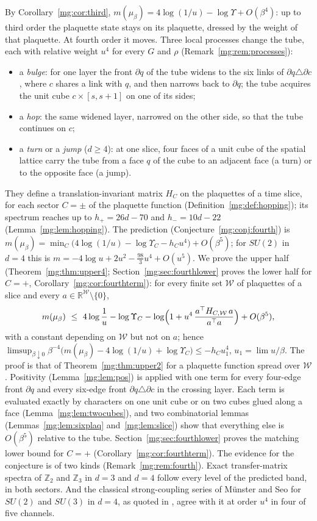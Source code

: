 \documentclass[11pt,a4paper]{article}
\theoremstyle{definition}
\theoremstyle{remark}
\newcommand{\R}{\mathbb{R}}
\begin{document}
By Corollary~\ref{mg:cor:third}, $m(\mu_\beta)=4\log(1/u)-\log\Upsilon+O(\beta^4)$: up to third order the plaquette state stays on its plaquette, dressed
by the weight of that plaquette. At fourth order it moves. Three local processes change the tube, each with relative weight $u^4$ for every $G$ and $\rho$
(Remark~\ref{mg:rem:processes}):
\begin{itemize}
\item a \emph{bulge}: for one layer the front $\partial q$ of the tube widens to the six links of $\partial q\triangle\partial c$, where $c$ shares a link with
$q$, and then narrows back to $\partial q$; the tube acquires the unit cube $c\times[s,s+1]$ on one of its sides;
\item a \emph{hop}: the same widened layer, narrowed on the other side, so that the tube continues on $c$;
\item a \emph{turn} or a \emph{jump} ($d\ge4$): at one slice, four faces of a unit cube of the spatial lattice carry the tube from a face $q$ of the cube to
an adjacent face (a turn) or to the opposite face (a jump).
\end{itemize}
They define a translation-invariant matrix $H_C$ on the plaquettes of a time slice, for each sector $C=\pm$ of the plaquette function
(Definition~\ref{mg:def:hopping}); its spectrum reaches up to $h_+=26d-70$ and $h_-=10d-22$ (Lemma~\ref{mg:lem:hopping}). The prediction
(Conjecture~\ref{mg:conj:fourth}) is $m(\mu_\beta)=\min_C\bigl(4\log(1/u)-\log\Upsilon_C-h_Cu^4\bigr)+O(\beta^5)$; for $SU(2)$ in $d=4$ this
is $m=-4\log u+2u^2-\frac{98}3u^4+O(u^5)$. We prove the upper half (Theorem~\ref{mg:thm:upper4}; Section~\ref{mg:sec:fourthlower} proves the lower half for $C=+$,
Corollary~\ref{mg:cor:fourthterm}): for every finite set $\mathcal W$ of plaquettes of a
slice and every $a\in\R^{\mathcal W}\setminus\{0\}$,
\[
m(\mu_\beta)\ \le\ 4\log\frac1u-\log\Upsilon_C-\log\Bigl(1+u^4\,\frac{a^\top H_{C,\mathcal W}\,a}{a^\top a}\Bigr)+O(\beta^5),
\]
with a constant depending on $\mathcal W$ but not on $a$; hence $\limsup_{\beta\downarrow0}\beta^{-4}\bigl(m(\mu_\beta)-4\log(1/u)+\log\Upsilon_C\bigr)\le-h_Cu_1^4$,
$u_1=\lim u/\beta$. The proof is that of Theorem~\ref{mg:thm:upper2} for a plaquette function spread over $\mathcal W$. Positivity
(Lemma~\ref{mg:lem:pos}) is applied with one term for every four-edge front $\partial q$ and every six-edge front $\partial q\triangle\partial c$ in the
crossing layer. Each term is evaluated exactly by characters on one unit cube or on two cubes glued along a face (Lemma~\ref{mg:lem:twocubes}), and two
combinatorial lemmas (Lemmas~\ref{mg:lem:sixplaq} and~\ref{mg:lem:slice}) show that everything else is $O(\beta^5)$ relative to the tube. Section~\ref{mg:sec:fourthlower} proves the
matching lower bound for $C=+$ (Corollary~\ref{mg:cor:fourthterm}). The evidence for the conjecture is of two kinds (Remark~\ref{mg:rem:fourth}). Exact transfer-matrix
spectra of $\mathbb Z_2$ and $\mathbb Z_3$ in $d=3$ and $d=4$ follow every level of the predicted band, in both sectors. And the classical strong-coupling
series of Münster and Seo for $SU(2)$ and $SU(3)$ in $d=4$, as quoted in \cite{LMP07}, agree with it at order $u^4$ in four of five channels.
\end{document}
